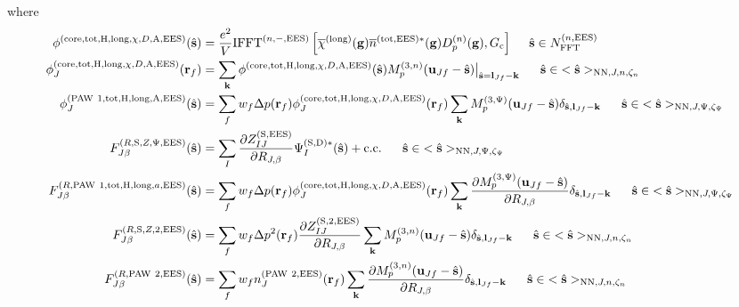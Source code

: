 \documentclass[paper=a4, fontsize=11pt]{article} %
\numberwithin{equation}{section} %
\numberwithin{figure}{section} %
\numberwithin{table}{section} %
\newcommand{\p}{\partial}
\newcommand{\ol}{\overline}
\newcommand{\bu}{{\bf{u}}}
\newcommand{\bl}{{\bf{l}}}
\newcommand{\bk}{{\bf{k}}}
\newcommand{\bs}{{\bf{s}}}
\newcommand{\bg}{{\bf{g}}}
\newcommand{\br}{{\bf{r}}}
\newcommand{\hs}{{\hat{\bf{s}}}}
\newcommand{\rS}{{\mathrm{S}}}
\newcommand{\rEES}{{\mathrm{EES}}}
\newcommand{\rcore}{{\mathrm{core}}}
\newcommand{\rNN}{{\mathrm{NN}}}
\newcommand{\rcc}{{\mathrm{c.c.}}}
\newcommand{\rlong}{{\mathrm{long}}}
\newcommand{\rP}{{\mathrm{PAW}}}
\newcommand{\rH}{{\mathrm{H}}}
\newcommand{\rA}{{\mathrm{A}}}
\newcommand{\rD}{{\mathrm{D}}}
\newcommand{\rtot}{{\mathrm{tot}}}
\newcommand{\RJb}{{R_{J,\beta}}}
\newcommand{\NFFTnEES}{{N^{(n,\rEES)}_{\mathrm{FFT}}}}
\newcommand{\Gc}{{G_{\mathrm{c}}}}
\newcommand{\Mn}{{M_p^{(3,n)}}}
\newcommand{\Mp}{{M_p^{(3,\Psi)}}}
\newcommand{\IFFTniEES}{{\mathrm{IFFT}^{(n,-,\rEES)}}}
\newcommand{\hsJp}{{<\hs>_{\rNN,J,\Psi,\zeta_\Psi}}}
\newcommand{\hsJn}{{<\hs>_{\rNN,J,n,\zeta_n}}}
\newcommand{\hsinJp}{{\ \ \ \ \ \hs  \in  \hsJp}}
\newcommand{\hsinJn}{{\ \ \ \ \ \hs  \in  \hsJn}}
\newcommand{\hsinnEES}{{\ \ \ \ \hs \in \NFFTnEES}}
\begin{document}
where
\begin{equation}
\begin{split}
\phi^{(\rcore,\rtot,\rH,\rlong,\chi,D,\rA,\rEES)}(\hs)
&=\frac{e^2}{V} \IFFTniEES \left[\ol \chi^{(\rlong)}(\bg)  \ol n^{(\rtot,\rEES)*}(\bg) D_p^{(n)}(\bg),\Gc\right] \hsinnEES \\
\phi_J^{(\rcore,\rtot,\rH,\rlong,\chi,D,\rA,\rEES)}(\br_f) 
&= \sum_{\bk} \phi^{(\rcore,\rtot,\rH,\rlong,\chi,D,\rA,\rEES)}(\hs) \Mn(\bu_{Jf}-\hat \bs) \big|_{\hat \bs=\bl_{Jf}-\bk} \hsinJn\\
\phi_J^{(\rP\ 1,\rtot,\rH,\rlong,\rA,\rEES)}(\hs) &= \sum_f w_f \Delta p(\br_f) \phi_J^{(\rcore,\rtot,\rH,\rlong,\chi,D,\rA,\rEES)}(\br_f)  \sum_{\bk} \Mp(\bu_{Jf}-\hat \bs) \delta_{\hat \bs,\bl_{Jf}-\bk} \hsinJp \\
F_{J\beta}^{(R,\rS,Z,\Psi,\rEES)}(\hs) &= \sum_I \frac{\p Z_{IJ}^{(\rS,\rEES)}}{\p \RJb}\Psi_I^{(\rS,\rD)*}(\hat \bs) + \rcc \hsinJp\\
F_{J\beta}^{(R,\rP\ 1,\rtot,\rH,\rlong,a,\rEES)}(\hs) &= \sum_f w_f \Delta p(\br_f) \phi_J^{(\rcore,\rtot,\rH,\rlong,\chi,D,\rA,\rEES)}(\br_f) \sum_{\bk} \frac{\p \Mp(\bu_{Jf}-\hat \bs)}{\p \RJb} \delta_{\hat \bs,\bl_{Jf}-\bk} \hsinJp \\
F_{J\beta}^{(R,\rS,Z,2,\rEES)}(\hs) &= \sum_f w_f  \Delta p^2(\br_f)\frac{\p Z_{IJ}^{(\rS,2,\rEES)}}{\p \RJb} \sum_{\bk}  \Mn(\bu_{Jf}-\hat \bs)\delta_{\hat \bs,\bl_{Jf}-\bk} \hsinJn \\
F_{J\beta}^{(R,\rP\ 2,\rEES)}(\hs) &= \sum_f w_f  n_J^{(\rP\ 2,\rEES)}(\br_f) \sum_{\bk}  \frac{\p \Mn(\bu_{Jf}-\hat \bs)}{\p \RJb}\delta_{\hat \bs,\bl_{Jf}-\bk} \hsinJn \\
\end{split}
\end{equation}

\newpage
\end{document}
